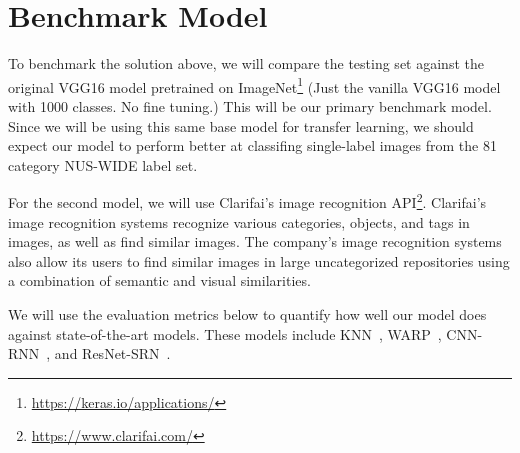 \documentclass[10pt, a4paper, twocolumn]{article} %
\begin{document}
\section{Benchmark Model\label{sec:5}} %


To benchmark the solution above, we will compare the testing set against the original VGG16 model pretrained on ImageNet\footnote{\url{https://keras.io/applications/}} (Just the vanilla VGG16 model with 1000 classes. No fine tuning.) This will be our primary benchmark model. Since we will be using this same base model for transfer learning, we should expect our model to perform better at classifing single-label images from the 81 category NUS-WIDE label set.

For the second model, we will use Clarifai's image recognition API\footnote{\url{https://www.clarifai.com/}}.  Clarifai’s image recognition systems recognize various categories, objects, and tags in images, as well as find similar images. The company’s image recognition systems also allow its users to find similar images in large uncategorized repositories using a combination of semantic and visual similarities.  

We will use the evaluation metrics below to quantify how well our model does against state-of-the-art models. These models include KNN~\cite{nus-wide-civr09}, WARP~\cite{GongJLTI13}, CNN-RNN~\cite{WangYMHHX16}, and ResNet-SRN~\cite{ZhuLOYW17}.



\end{document}
